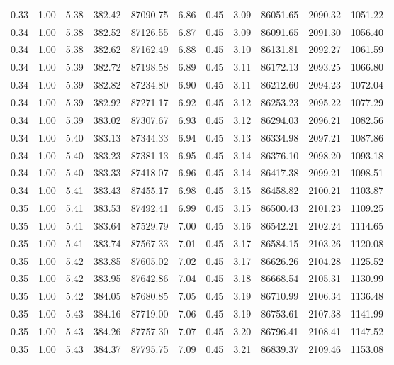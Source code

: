 \begin{table}[!ht]
\begin{tabular}{rrrrrrrrrrr}
0.33 & 1.00 & 5.38 & 382.42 & 87090.75 & 6.86 & 0.45 & 3.09 & 86051.65 & 2090.32 & 1051.22 \\
0.34 & 1.00 & 5.38 & 382.52 & 87126.55 & 6.87 & 0.45 & 3.09 & 86091.65 & 2091.30 & 1056.40 \\
0.34 & 1.00 & 5.38 & 382.62 & 87162.49 & 6.88 & 0.45 & 3.10 & 86131.81 & 2092.27 & 1061.59 \\
0.34 & 1.00 & 5.39 & 382.72 & 87198.58 & 6.89 & 0.45 & 3.11 & 86172.13 & 2093.25 & 1066.80 \\
0.34 & 1.00 & 5.39 & 382.82 & 87234.80 & 6.90 & 0.45 & 3.11 & 86212.60 & 2094.23 & 1072.04 \\
0.34 & 1.00 & 5.39 & 382.92 & 87271.17 & 6.92 & 0.45 & 3.12 & 86253.23 & 2095.22 & 1077.29 \\
0.34 & 1.00 & 5.39 & 383.02 & 87307.67 & 6.93 & 0.45 & 3.12 & 86294.03 & 2096.21 & 1082.56 \\
0.34 & 1.00 & 5.40 & 383.13 & 87344.33 & 6.94 & 0.45 & 3.13 & 86334.98 & 2097.21 & 1087.86 \\
0.34 & 1.00 & 5.40 & 383.23 & 87381.13 & 6.95 & 0.45 & 3.14 & 86376.10 & 2098.20 & 1093.18 \\
0.34 & 1.00 & 5.40 & 383.33 & 87418.07 & 6.96 & 0.45 & 3.14 & 86417.38 & 2099.21 & 1098.51 \\
0.34 & 1.00 & 5.41 & 383.43 & 87455.17 & 6.98 & 0.45 & 3.15 & 86458.82 & 2100.21 & 1103.87 \\
0.35 & 1.00 & 5.41 & 383.53 & 87492.41 & 6.99 & 0.45 & 3.15 & 86500.43 & 2101.23 & 1109.25 \\
0.35 & 1.00 & 5.41 & 383.64 & 87529.79 & 7.00 & 0.45 & 3.16 & 86542.21 & 2102.24 & 1114.65 \\
0.35 & 1.00 & 5.41 & 383.74 & 87567.33 & 7.01 & 0.45 & 3.17 & 86584.15 & 2103.26 & 1120.08 \\
0.35 & 1.00 & 5.42 & 383.85 & 87605.02 & 7.02 & 0.45 & 3.17 & 86626.26 & 2104.28 & 1125.52 \\
0.35 & 1.00 & 5.42 & 383.95 & 87642.86 & 7.04 & 0.45 & 3.18 & 86668.54 & 2105.31 & 1130.99 \\
0.35 & 1.00 & 5.42 & 384.05 & 87680.85 & 7.05 & 0.45 & 3.19 & 86710.99 & 2106.34 & 1136.48 \\
0.35 & 1.00 & 5.43 & 384.16 & 87719.00 & 7.06 & 0.45 & 3.19 & 86753.61 & 2107.38 & 1141.99 \\
0.35 & 1.00 & 5.43 & 384.26 & 87757.30 & 7.07 & 0.45 & 3.20 & 86796.41 & 2108.41 & 1147.52 \\
0.35 & 1.00 & 5.43 & 384.37 & 87795.75 & 7.09 & 0.45 & 3.21 & 86839.37 & 2109.46 & 1153.08 \\

\end{tabular}
\end{table}

